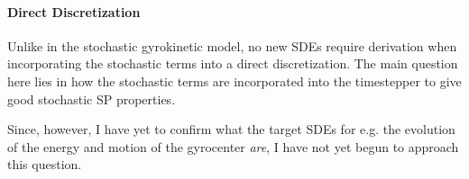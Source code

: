 \paragraph*{Direct Discretization}
    \begin{remark}
        Unlike in the stochastic gyrokinetic model, no new SDEs require derivation when incorporating the stochastic terms into a direct discretization. The main question here lies in how the stochastic terms are incorporated into the timestepper to give good stochastic SP properties.
        
        Since, however, I have yet to confirm what the target SDEs for e.g. the evolution of the energy and motion of the gyrocenter \emph{are}, I have not yet begun to approach this question.
    \end{remark}

  
